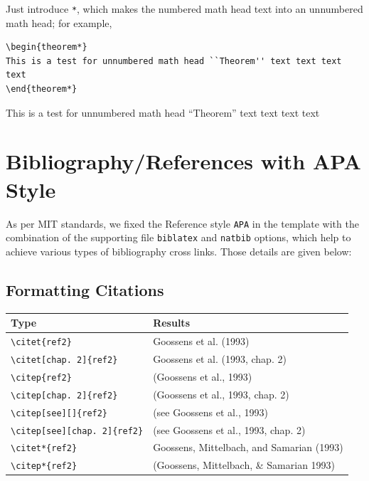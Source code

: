 \documentclass[]{imag-ms-template}
\begin{document}
Just introduce \verb!*!, which makes the numbered math head text
into an unnumbered math head; for example,

\begin{verbatim}
\begin{theorem*}
This is a test for unnumbered math head ``Theorem'' text text text text
\end{theorem*}
\end{verbatim}

\begin{theorem*}
This is a test for unnumbered math head ``Theorem'' text text text text
\end{theorem*}

\section{Bibliography/References with APA Style}

As per MIT standards, we fixed the Reference style \verb!APA! in
the template with the combination of the supporting file
\verb!biblatex! and \verb!natbib! options, which
help to achieve various types of bibliography cross links. Those details are given below:

\subsection{Formatting Citations}

\noindent\begin{tabular}{@{}ll}
\bf Type&\bf Results\\
\midrule
\verb+\citet{ref2}+&Goossens et al. (1993)\\
\verb+\citet[chap. 2]{ref2}+&Goossens et al. (1993, chap. 2)\\
    \verb+\citep{ref2}+	    &   	(Goossens et al., 1993)\\
    \verb+\citep[chap. 2]{ref2}+ 	&    	(Goossens et al., 1993, chap. 2)\\
    \verb+\citep[see][]{ref2}+ 	 &    	(see Goossens et al., 1993)\\
    \verb+\citep[see][chap. 2]{ref2}+ 	&    	(see Goossens et al., 1993, chap. 2)\\
    \verb+\citet*{ref2}+ 	    &    	Goossens, Mittelbach, and Samarian (1993)\\
    \verb+\citep*{ref2}+	    &    	(Goossens, Mittelbach, \& Samarian
    1993) \\
\end{tabular}
\end{document}
